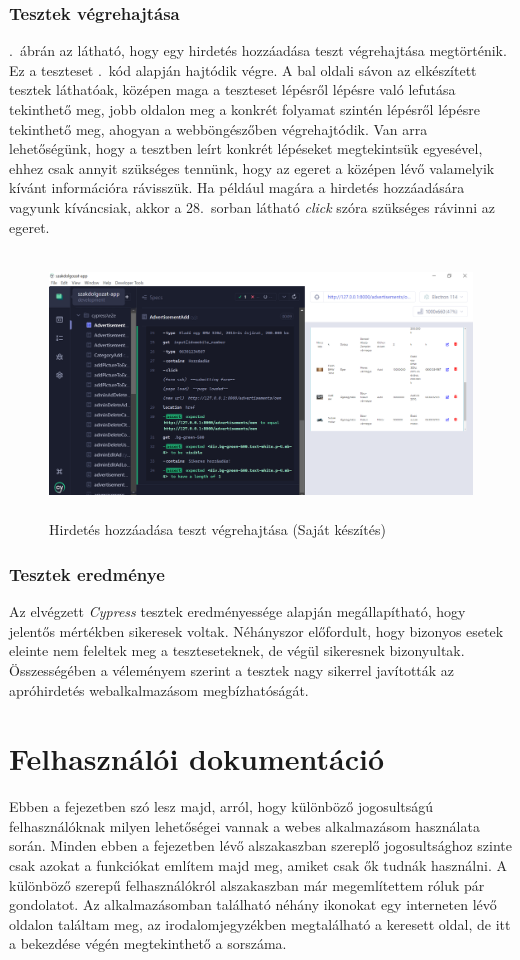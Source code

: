 \documentclass[]{thesis-ekf}
\theoremstyle{definition}
\theoremstyle{remark}
\begin{document}
	\subsection{Tesztek végrehajtása}
		.~ábrán az látható, hogy egy hirdetés hozzáadása teszt végrehajtása megtörténik. Ez a teszteset .~kód alapján hajtódik végre. A bal oldali sávon az elkészített tesztek láthatóak, középen maga a teszteset lépésről lépésre való lefutása tekinthető meg, jobb oldalon meg a konkrét folyamat szintén lépésről lépésre tekinthető meg, ahogyan a webböngészőben végrehajtódik. Van arra lehetőségünk, hogy a tesztben leírt konkrét lépéseket megtekintsük egyesével, ehhez csak annyit szükséges tennünk, hogy az egeret a középen lévő valamelyik kívánt információra rávisszük. Ha például magára a hirdetés hozzáadására vagyunk kíváncsiak, akkor a 28.~sorban látható \emph{click} szóra szükséges rávinni az egeret.
		\begin{figure}[ht!]
			\centering
			\includegraphics[height=7cm]{./teszteles/teszt}
			\caption{Hirdetés hozzáadása teszt végrehajtása (Saját készítés)} 
			\label{teszt-vegrehajtasa}
		\end{figure}
		
	\subsection{Tesztek eredménye}
		Az elvégzett \emph{Cypress} tesztek eredményessége alapján megállapítható, hogy jelentős mértékben sikeresek voltak. Néhányszor előfordult, hogy bizonyos esetek eleinte nem feleltek meg a teszteseteknek, de végül sikeresnek bizonyultak. Összességében a véleményem szerint a tesztek nagy sikerrel javították az apróhirdetés webalkalmazásom megbízhatóságát.   
		
	\chapter{Felhasználói dokumentáció}\label{ch-felhasznaloi}
		Ebben a fejezetben szó lesz majd, arról, hogy különböző jogosultságú felhasználóknak milyen lehetőségei vannak a webes alkalmazásom használata során. Minden ebben a fejezetben lévő alszakaszban szereplő jogosultsághoz szinte csak azokat a funkciókat említem majd meg, amiket csak ők tudnák használni. A különböző szerepű felhasználókról \az{\ref{sc-plantuml}} alszakaszban már megemlítettem róluk pár gondolatot. Az alkalmazásomban található néhány ikonokat egy interneten lévő oldalon találtam meg, az irodalomjegyzékben megtalálható a keresett oldal, de itt a bekezdése végén megtekinthető a sorszáma.\cite{Ikon} 
\end{document}

